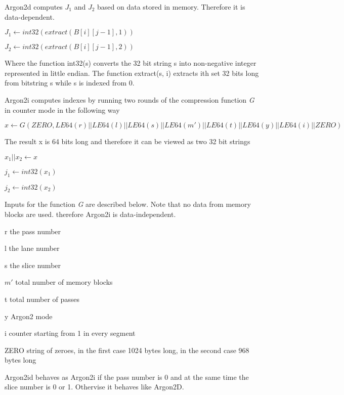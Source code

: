 \documentclass[nolof]{fithesis3}
\begin{document}
Argon2d computes \(J_1\) and \(J_2\) based on data stored in memory. Therefore it is data-dependent.

\(J_1 \leftarrow int32(extract(B[i][j-1], 1))\)

\(J_2 \leftarrow int32(extract(B[i][j-1], 2))\)

Where the function int32(s) converts the 32 bit string s into non-negative integer represented in little endian. The function extract(s, i) extracts ith set 32 bits long from bitstring s while s is indexed from 0.

Argon2i computes indexes by running two rounds of the compression function \emph{G} in counter mode in the following way

\(x \leftarrow G(ZERO, LE64(r) || LE64(l) || LE64(s) || LE64(m') || LE64(t) || LE64(y) || LE64(i) || ZERO) \)

The result x is 64 bits long and therefore it can be viewed as two 32 bit strings

\(x_1 || x_2 \leftarrow x\)

\(j_1 \leftarrow int32(x_1)\)

\(j_2 \leftarrow int32(x_2)\)

Inputs for the function \emph{G} are described below. Note that no data from memory blocks are used. therefore Argon2i is data-independent.

\begin{description}
\item{r} the pass number

\item{l} the lane number

\item{s} the slice number

\item{\(m'\)} total number of memory blocks

\item{t} total number of passes

\item{y} Argon2 mode

\item{i} counter starting from 1 in every segment

\item{ZERO} string of zeroes, in the first case 1024 bytes long, in the second case 968 bytes long
\end{description}

Argon2id behaves as Argon2i if the pass number is 0 and at the same time the slice number is 0 or 1. Othervise it behaves like Argon2D.
\end{document}
